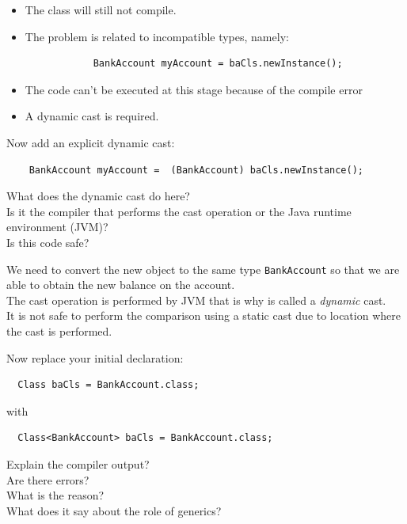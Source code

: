\documentclass[11pt,a4paper]{exam}
\begin{document}
\begin{questions}
\begin{solution}
\begin{itemize}
\item The class will still not compile.
\item The problem is related to incompatible types, namely:
\begin{Verbatim}
            BankAccount myAccount = baCls.newInstance();
\end{Verbatim}
\item The code can’t be executed at this stage because of the compile error 
\item A dynamic cast is required.
\end{itemize}	
\end{solution}

\item
Now add an explicit dynamic cast:
\begin{Verbatim}
    BankAccount myAccount =  (BankAccount) baCls.newInstance();
\end{Verbatim}

\noindent What does the dynamic cast do here? \\
Is it the compiler that performs the cast operation or the Java runtime environment (JVM)? \\
Is this code safe?

\begin{solution}
We need to convert the new object to the same type \verb!BankAccount! 
so that we are able to obtain the new balance on the account. \\
The cast operation is performed by JVM that is why is called a \emph{dynamic} cast.\\
It is not safe to perform the comparison using a static cast due to 
location where the cast is performed. 	
\end{solution}

\item
Now replace your initial declaration:
\begin{Verbatim}
  Class baCls = BankAccount.class;
\end{Verbatim}
with
\begin{Verbatim}
  Class<BankAccount> baCls = BankAccount.class;
\end{Verbatim}

\noindent
Explain the compiler output? \\
Are there errors? \\
What is the reason? \\
What does it say about the role of generics?


\end{questions}
\end{document}
